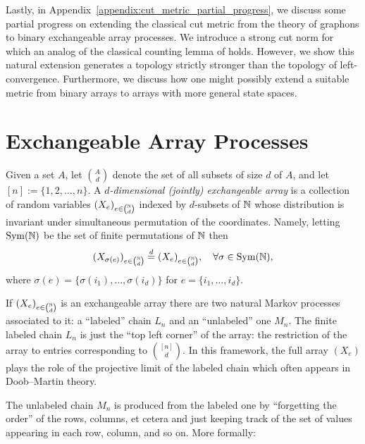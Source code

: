 Lastly, in Appendix~\ref{appendix:cut_metric_partial_progress}, we discuss some partial progress
on extending the classical cut metric from the theory of graphons to binary exchangeable array processes.
We introduce a strong cut norm for which an analog of the classical counting lemma of \cite{lovasz2004_limits_dense_graph_sequences}
holds. However, we show this natural extension generates a topology strictly stronger than the topology of left-convergence.
Furthermore, we discuss how one might possibly extend a suitable metric from binary arrays to arrays with more general state spaces.

\section{Exchangeable Array Processes}
\label{sec:exchangeable_array_processes}

Given a set $A$, let $\binom{A}{d}$ denote the set of all subsets of size $d$ of $A$, and let $[n] := \{1,2,\ldots,n\}$.
 A \textit{$d$-dimensional (jointly) exchangeable array} is a collection of random variables
 $(X_e)_{e \in \binom{\mathbb{N}}{d}}$ indexed by $d$-subsets of $\mathbb{N}$ whose distribution is invariant under
 simultaneous permutation of the coordinates. Namely, letting $\operatorname{Sym}(\mathbb{N})$ be the set of finite
 permutations of $\mathbb{N}$ then
%
\[(X_{\sigma(e)})_{e \in \binom{\mathbb{N}}{d}} \overset{d}{=} (X_e)_{e \in \binom{\mathbb{N}}{d}}, \quad \forall \sigma \in \operatorname{Sym}(\mathbb{N}),\]
%
\noindent where $\sigma(e) = \{\sigma(i_1),\ldots,\sigma(i_d)\}$ for $e = \{i_1,\ldots,i_d\}$.

If $(X_e)_{e \in \binom{\mathbb{N}}{d}}$ is an exchangeable array there are two natural Markov processes
associated to it: a ``labeled'' chain $L_n$ and an ``unlabeled'' one $M_n$. The finite labeled chain $L_n$ is just the ``top left corner'' of the array: the restriction
 of the array to entries corresponding to $\binom{[n]}{d}$. In this framework, the full
  array $(X_e)$ plays the role of the projective limit of the labeled chain which often
   appears in Doob--Martin theory.

The unlabeled chain $M_n$ is produced from the labeled one by ``forgetting the order'' of the rows,
columns, et cetera and just keeping track of the set of values appearing in each row, column, and
so on. More formally:

